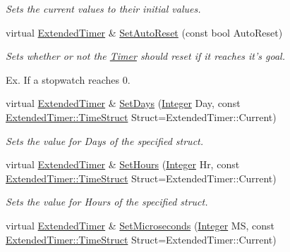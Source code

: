 \begin{DoxyCompactItemize}
\begin{DoxyCompactList}\small\item\em Sets the current values to their initial values. \item\end{DoxyCompactList}\item 
virtual \hyperlink{classMezzanine_1_1ExtendedTimer}{ExtendedTimer} \& \hyperlink{classMezzanine_1_1ExtendedTimer_ac0e2fcf76c0fe1445ff36b07131a1657}{SetAutoReset} (const bool AutoReset)
\begin{DoxyCompactList}\small\item\em Sets whether or not the \hyperlink{classMezzanine_1_1Timer}{Timer} should reset if it reaches it's goal. \par
 Ex. If a stopwatch reaches 0. \item\end{DoxyCompactList}\item 
virtual \hyperlink{classMezzanine_1_1ExtendedTimer}{ExtendedTimer} \& \hyperlink{classMezzanine_1_1ExtendedTimer_aadc09173ecb481cbe7e2c3703e1ef34d}{SetDays} (\hyperlink{namespaceMezzanine_ac3576e52af3c62d13dde94829e0c5465}{Integer} Day, const \hyperlink{classMezzanine_1_1ExtendedTimer_a52119e2da54ea7ae5da0dc1f921a3b61}{ExtendedTimer::TimeStruct} Struct=ExtendedTimer::Current)
\begin{DoxyCompactList}\small\item\em Sets the value for Days of the specified struct. \item\end{DoxyCompactList}\item 
virtual \hyperlink{classMezzanine_1_1ExtendedTimer}{ExtendedTimer} \& \hyperlink{classMezzanine_1_1ExtendedTimer_a57d6151f99b75a45433bf919dd218b64}{SetHours} (\hyperlink{namespaceMezzanine_ac3576e52af3c62d13dde94829e0c5465}{Integer} Hr, const \hyperlink{classMezzanine_1_1ExtendedTimer_a52119e2da54ea7ae5da0dc1f921a3b61}{ExtendedTimer::TimeStruct} Struct=ExtendedTimer::Current)
\begin{DoxyCompactList}\small\item\em Sets the value for Hours of the specified struct. \item\end{DoxyCompactList}\item 
virtual \hyperlink{classMezzanine_1_1ExtendedTimer}{ExtendedTimer} \& \hyperlink{classMezzanine_1_1ExtendedTimer_abf97ea669cc7c816a94fb8162e575575}{SetMicroseconds} (\hyperlink{namespaceMezzanine_ac3576e52af3c62d13dde94829e0c5465}{Integer} MS, const \hyperlink{classMezzanine_1_1ExtendedTimer_a52119e2da54ea7ae5da0dc1f921a3b61}{ExtendedTimer::TimeStruct} Struct=ExtendedTimer::Current)

\end{DoxyCompactItemize}
